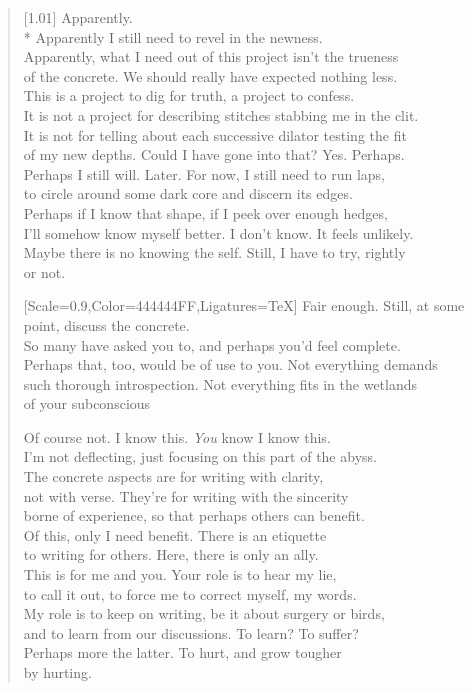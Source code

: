 \begin{verse}[1.01\textwidth]
  Apparently.\\*
   Apparently I still need to revel in the newness.\\
  Apparently, what I need out of this project isn't the trueness\\
  of the concrete. We should really have expected nothing less.\\
  This is a project to dig for truth, a project to confess.\\
  It is not a project for describing stitches stabbing me in the clit.\\
  It is not for telling about each successive dilator testing the fit\\
  of my new depths. Could I have gone into that? Yes. Perhaps.\\\newpage
  Perhaps I still will. Later. For now, I still need to run laps,\\
  to circle around some dark core and discern its edges.\\
  Perhaps if I know that shape, if I peek over enough hedges,\\
  I'll somehow know myself better. I don't know. It feels unlikely.\\
  Maybe there is no knowing the self. Still, I have to try, rightly\\
  or not.

  {[Scale=0.9,Color=444444FF,Ligatures=TeX]
  \vin Fair enough. Still, at some point, discuss the concrete.\\
  \vin So many have asked you to, and perhaps you'd feel complete.\\
  \vin Perhaps that, too, would be of use to you. Not everything demands\\
  \vin such thorough introspection. Not everything fits in the wetlands\\
  \vin of your subconscious}

  Of course not. I know this. \emph{You} know I know this.\\
  I'm not deflecting, just focusing on this part of the abyss.\\
  The concrete aspects are for writing with clarity,\\
  not with verse. They're for writing with the sincerity\\
  borne of experience, so that perhaps others can benefit.\\
  Of this, only I need benefit. There is an etiquette\\
  to writing for others. Here, there is only an ally.\\
  This is for me and you. Your role is to hear my lie,\\
  to call it out, to force me to correct myself, my words.\\
  My role is to keep on writing, be it about surgery or birds,\\
  and to learn from our discussions. To learn? To suffer?\\
  Perhaps more the latter. To hurt, and grow tougher\\
  by hurting.
  \newpage


\end{verse}
